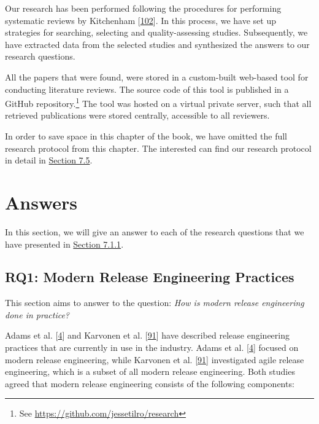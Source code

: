 \documentclass[]{book}
\let\rmarkdownfootnote\footnote%
\def\footnote{\protect\rmarkdownfootnote}
\begin{document}
Our research has been performed following the procedures for performing
systematic reviews by Kitchenham
{[}\protect\hyperlink{ref-kitchenham2004procedures}{102}{]}. In this
process, we have set up strategies for searching, selecting and
quality-assessing studies. Subsequently, we have extracted data from the
selected studies and synthesized the answers to our research questions.

All the papers that were found, were stored in a custom-built web-based
tool for conducting literature reviews. The source code of this tool is
published in a GitHub repository.\footnote{See
  \url{https://github.com/jessetilro/research}} The tool was hosted on a
virtual private server, such that all retrieved publications were stored
centrally, accessible to all reviewers.

In order to save space in this chapter of the book, we have omitted the
full research protocol from this chapter. The interested can find our
research protocol in detail in \protect\hyperlink{appendix}{Section
7.5}.

\section{Answers}\label{answers-3}

In this section, we will give an answer to each of the research
questions that we have presented in
\protect\hyperlink{research-questions-1}{Section 7.1.1}.

\subsection{RQ1: Modern Release Engineering
Practices}\label{rq1-modern-release-engineering-practices}

This section aims to answer to the question: \emph{How is modern release
engineering done in practice?}

Adams et al. {[}\protect\hyperlink{ref-adams2016a}{4}{]} and Karvonen et
al. {[}\protect\hyperlink{ref-karvonen2017a}{91}{]} have described
release engineering practices that are currently in use in the industry.
Adams et al. {[}\protect\hyperlink{ref-adams2016a}{4}{]} focused on
modern release engineering, while Karvonen et al.
{[}\protect\hyperlink{ref-karvonen2017a}{91}{]} investigated agile
release engineering, which is a subset of all modern release
engineering. Both studies agreed that modern release engineering
consists of the following components:
\end{document}
